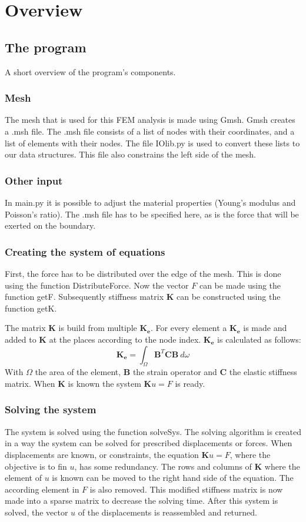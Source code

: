 \chapter{Overview}

\section{The program}
A short overview of the program's components.

\subsection{Mesh}
The mesh that is used for this FEM analysis is made using Gmsh. Gmsh creates a .msh file. The .msh file consists of a list of nodes with their coordinates, and a list of elements with their nodes. The file IOlib.py is used to convert these lists to our data structures. This file also constrains the left side of the mesh. 
\subsection{Other input}
In main.py it is possible to adjust the material properties (Young's modulus and Poisson's ratio). The .msh file has to be specified here, as is the force that will be exerted on the boundary. 
\subsection{Creating the system of equations}
First, the force has to be distributed over the edge of the mesh. This is done using the function Distribute\textunderscore Force. Now the vector $F$ can be made using the function getF. Subsequently stiffness matrix $\mathbf{K}$ can be constructed using the function getK. 

The matrix $\mathbf{K}$ is build from multiple $\mathbf{K_e}$. For every element a $\mathbf{K_e}$ is made and added to $\mathbf{K}$ at the places according to the node index. $\mathbf{K_e}$ is calculated as follows:
\begin{equation}
\mathbf{K_e} = \int_\Omega \mathbf{B}^T \mathbf{C} \mathbf{B} \ d\omega
\end{equation}
With $\Omega$ the area of the element, $\mathbf{B}$ the strain operator and $\mathbf{C}$ the elastic stiffness matrix.  When $\mathbf{K}$ is known the system $\mathbf{K} u = F$ is ready.
\subsection{Solving the system}
The system is solved using the function solveSys. The solving algorithm is created in a way the system can be solved for prescribed displacements or forces. When displacements are known, or constraints, the equation $\mathbf{K} u = F$, where the objective is to fin $u$, has some redundancy. The rows and columns of $\mathbf{K}$ where the element of $u$ is known can be moved to the right hand side  of the equation. The according element in $F$ is also removed.
This modified stiffness matrix is now made into a sparse matrix to decrease the solving time. After this system is solved, the vector $u$ of the displacements is reassembled and returned. 

